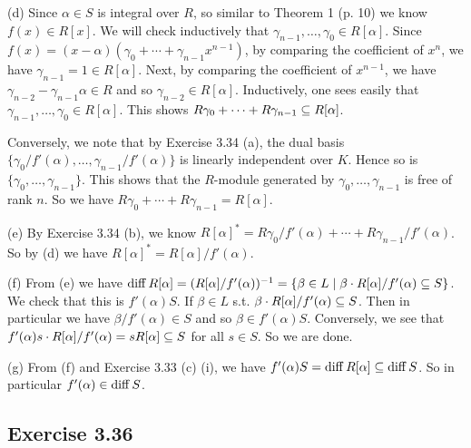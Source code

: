 \documentclass[../Marcus.tex]{subfiles}
\begin{document}
(d) Since $\alpha\in S$ is integral over $R$, so similar to Theorem 1 (p. 10) we know $f(x)\in R[x]$. We will check inductively that $\gamma_{n-1},\ldots,\gamma_0 \in R[\alpha]$. Since $f(x) = (x-\alpha)(\gamma_0+\cdots+\gamma_{n-1}x^{n-1})$, by comparing the coefficient of $x^n$, we have $\gamma_{n-1} = 1 \in R[\alpha]$. Next, by comparing the coefficient of $x^{n-1}$, we have $\gamma_{n-2}-\gamma_{n-1}\alpha \in R$ and so $\gamma_{n-2} \in R[\alpha]$. Inductively, one sees easily that $\gamma_{n-1},\ldots,\gamma_0 \in R[\alpha]$. This shows $R\gamma_0 + \cdots + R\gamma_{n-1} \subseteq R[\alpha]$.

Conversely, we note that by Exercise 3.34 (a), the dual basis $\{\gamma_0/f'(\alpha),\ldots,\gamma_{n-1}/f'(\alpha)\}$ is linearly independent over $K$. Hence so is $\{\gamma_0,\ldots,\gamma_{n-1}\}$. This shows that the $R$-module generated by $\gamma_0,\ldots,\gamma_{n-1}$ is free of rank $n$. So we have $R\gamma_0 + \cdots + R\gamma_{n-1} = R[\alpha]$. 

(e) By Exercise 3.34 (b), we know $R[\alpha]^* = R\gamma_0/f'(\alpha) + \cdots + R\gamma_{n-1}/f'(\alpha)$. So by (d) we have $R[\alpha]^* = R[\alpha]/f'(\alpha)$.

(f) From (e) we have $\operatorname{diff} R[\alpha] = (R[\alpha]/f'(\alpha))^{-1} = \{ \beta \in L \mid \beta \cdot R[\alpha]/f'(\alpha) \subseteq S\}$. We check that this is $f'(\alpha)S$. If $ \beta \in L$ s.t. $\beta \cdot R[\alpha]/f'(\alpha) \subseteq S$. Then in particular we have $\beta/f'(\alpha) \in S$ and so $\beta \in f'(\alpha)S$. Conversely, we see that $f'(\alpha)s \cdot R[\alpha]/f'(\alpha) = sR[\alpha] \subseteq S$ for all $s\in S$. So we are done.

(g) From (f) and Exercise 3.33 (c) (i), we have $f'(\alpha)S = \operatorname{diff} R[\alpha] \subseteq \operatorname{diff} S$. So in particular $f'(\alpha) \in \operatorname{diff} S$.

\subsection*{Exercise 3.36}

\begin{comment}
(a) It's sufficient to check that $\alpha_1,\ldots,\alpha_n$ are linearly independent over $K$. If not, then there exist $c_1,\ldots,c_n \in K$ not all zero s.t. $\sum c_i\alpha_i = 0$. By Exercise 2.25, we take $0 \neq m\in\ZZ$ s.t. $mc_i\in R$ for all $i$. Then $\sum mc_i\alpha_i = 0$. Since $\alpha_1,\ldots,\alpha_n$ are linearly independent mod $P$, so by considering mod $PS$ we have $mc_i \in P$ for all $i$.

Now, with the notation as in the Lemma of Theorem 22 (b) (p. 48), we set $A=P$ and $B=(mc_1,\ldots,mc_n) \neq 0$. Then there exists $\gamma\in K$ s.t. $\gamma B\subset R$ and $\gamma B\not\subset A=P$. So we have all $\gamma mc_i \in R$ but there's some $\gamma mc_{i_0} \notin P$. But by considering the equation $\sum \gamma mc_i\alpha_i = 0$ mod $PS$, we have $\gamma mc_i \in P$ for all $i$, a contradiction.
\end{comment}
\end{document}
